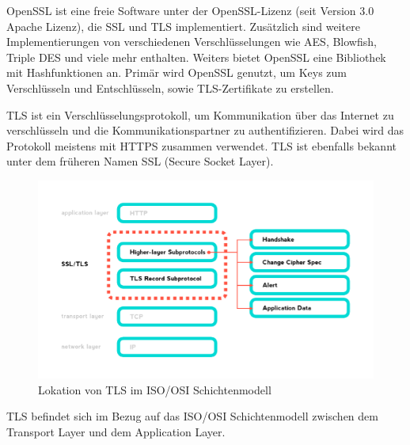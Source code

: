
OpenSSL ist eine freie Software unter der OpenSSL-Lizenz (seit Version 3.0 Apache Lizenz), die SSL und TLS implementiert. Zusätzlich sind weitere Implementierungen von verschiedenen Verschlüsselungen wie AES, Blowfish, Triple DES und viele mehr enthalten. Weiters bietet OpenSSL eine Bibliothek mit Hashfunktionen an. Primär wird OpenSSL genutzt, um Keys zum Verschlüsseln und Entschlüsseln, sowie TLS-Zertifikate zu erstellen. 



TLS ist ein Verschlüsselungsprotokoll, um Kommunikation über das Internet zu verschlüsseln und die Kommunikationspartner zu authentifizieren. Dabei wird das Protokoll meistens mit HTTPS zusammen verwendet. TLS ist ebenfalls bekannt unter dem früheren Namen SSL (Secure Socket Layer).  

\begin{figure}[H]
    \centering
    \includegraphics{media/OpenSSL/info.png}
    \caption{Lokation von TLS im ISO/OSI Schichtenmodell \cite{BreakDownTLS}}
\end{figure}

TLS befindet sich im Bezug auf das ISO/OSI Schichtenmodell zwischen dem Transport Layer und dem Application Layer.


